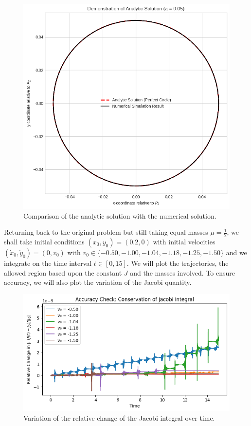\documentclass{article}
\begin{document}
\begin{figure}
    \centering
    \includegraphics[width=1\linewidth]{images/circular_orbit.png}
    \caption{Comparison of the analytic solution with the numerical solution.}
\end{figure}

Returning back to the original problem but still taking equal masses \(\mu = \frac{1}{2}\), we shall take initial conditions \((x_0, y_0) = (0.2, 0)\) with initial velocities \((\dot{x}_0, \dot{y}_0) = (0, v_0)\) with \(v_0 \in \{-0.50, -1.00, -1.04, -1.18, -1.25, -1.50\}\) and we integrate on the time interval \(t \in [0, 15]\). We will plot the trajectories, the allowed region based upon the constant \(J\) and the masses involved. To ensure accuracy, we will also plot the variation of the Jacobi quantity.

\begin{figure}
    \centering
    \includegraphics[width=1\linewidth]{images/spacetravel_accuracy.png}
    \caption{Variation of the relative change of the Jacobi integral over time.}
\end{figure}
\end{document}
